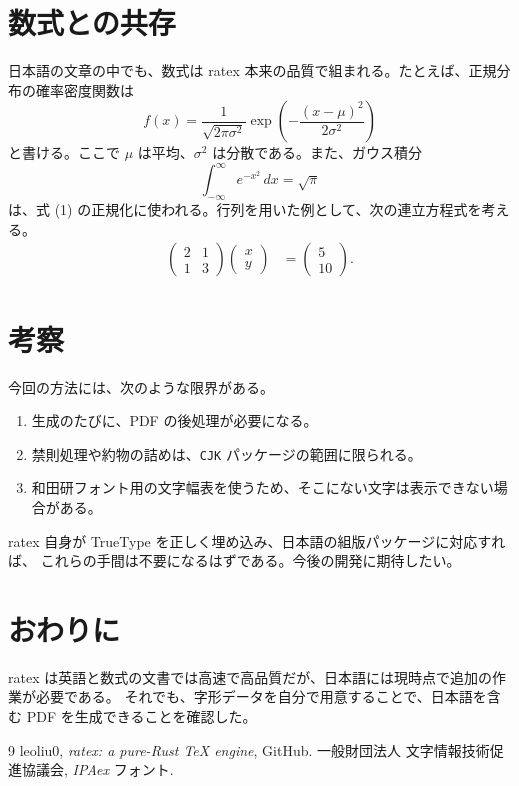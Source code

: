\documentclass[11pt]{article}
\newcommand{\goth}[1]{{\sffamily #1}}
\begin{document}
\section{\goth{数式との共存}}
日本語の文章の中でも、数式は ratex 本来の品質で組まれる。たとえば、正規分布の確率密度関数は
\begin{equation}
  f(x) = \frac{1}{\sqrt{2\pi\sigma^2}} \exp\!\left( -\frac{(x-\mu)^2}{2\sigma^2} \right)
\end{equation}
と書ける。ここで $\mu$ は平均、$\sigma^2$ は分散である。また、ガウス積分
\begin{equation}
  \int_{-\infty}^{\infty} e^{-x^2}\,dx = \sqrt{\pi}
\end{equation}
は、式 (1) の正規化に使われる。行列を用いた例として、次の連立方程式を考える。
\begin{align}
  \begin{pmatrix} 2 & 1 \\ 1 & 3 \end{pmatrix}
  \begin{pmatrix} x \\ y \end{pmatrix}
  &=
  \begin{pmatrix} 5 \\ 10 \end{pmatrix}.
\end{align}

\section{\goth{考察}}
今回の方法には、次のような限界がある。
\begin{enumerate}
  \item 生成のたびに、PDF の後処理が必要になる。
  \item 禁則処理や約物の詰めは、\texttt{CJK} パッケージの範囲に限られる。
  \item 和田研フォント用の文字幅表を使うため、そこにない文字は表示できない場合がある。
\end{enumerate}
ratex 自身が TrueType を正しく埋め込み、日本語の組版パッケージに対応すれば、
これらの手間は不要になるはずである。今後の開発に期待したい。

\section{\goth{おわりに}}
ratex は英語と数式の文書では高速で高品質だが、日本語には現時点で追加の作業が必要である。
それでも、字形データを自分で用意することで、日本語を含む PDF を生成できることを確認した。

\begin{thebibliography}{9}
 leoliu0, \textit{ratex: a pure-Rust TeX engine}, GitHub.
 一般財団法人 文字情報技術促進協議会, \textit{IPAex} フォント.
\end{thebibliography}
\end{document}
